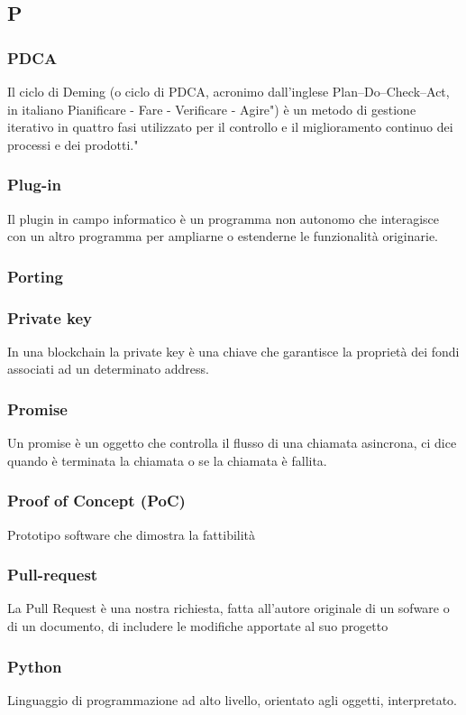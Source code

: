 \subsection*{\textbf{\hfill \Huge{P} \hfill}} 
\subsubsection*{PDCA}
Il ciclo di Deming (o ciclo di PDCA, acronimo dall'inglese Plan–Do–Check–Act, in italiano Pianificare - Fare - Verificare - Agire") è un metodo di gestione iterativo in quattro fasi utilizzato per il controllo e il miglioramento continuo dei processi e dei prodotti."
\subsubsection*{Plug-in}
Il plugin in campo informatico è un programma non autonomo che interagisce con un altro programma per ampliarne o estenderne le funzionalità originarie.
\subsubsection*{Porting}

\subsubsection*{Private key}
In una blockchain la private key è una chiave che garantisce la proprietà dei fondi associati ad un determinato address.
\subsubsection*{Promise}
Un promise è un oggetto che controlla il flusso di una chiamata asincrona, ci dice quando è terminata la chiamata o se la chiamata è fallita.
\subsubsection*{Proof of Concept (PoC)}
Prototipo software che dimostra la fattibilità 
\subsubsection*{Pull-request}
La Pull Request è una nostra richiesta, fatta all’autore originale di un sofware o di un documento, di includere le modifiche apportate al suo progetto
\subsubsection*{Python}
Linguaggio di programmazione ad alto livello, orientato agli oggetti, interpretato.

